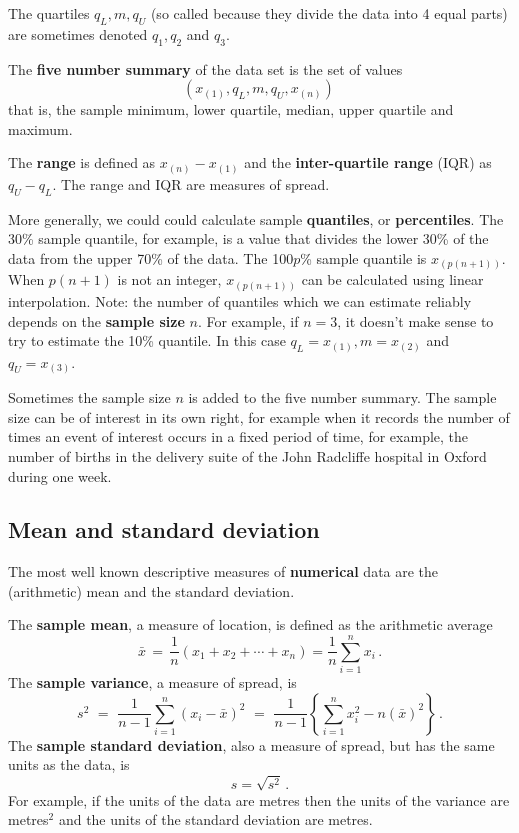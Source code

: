 \documentclass[
  british,
  11pt,
  openany, a4paper]{book}
\begin{document}
The quartiles \(q_L, m, q_U\) (so called because they divide the data into 4 equal parts) are sometimes denoted \(q_1, q_2\) and \(q_3\).

The \textbf{five number summary} of the data set is the set of values
\[(x_{(1)},q_L,m,q_U,x_{(n)})\,\]
that is, the sample minimum, lower quartile, median, upper quartile and maximum.

The \textbf{range} is defined as \(x_{(n)}-x_{(1)}\) and the \textbf{inter-quartile
range} (IQR) as \(q_U-q_L\). The range and IQR are measures of spread.

More generally, we could could calculate sample \textbf{quantiles}, or \textbf{percentiles}. The 30\% sample quantile, for example, is a value that divides the lower 30\% of the data from the upper 70\% of the data. The 100\(p\)\% sample quantile is \(x_{(p(n+1))}\). When \(p(n+1)\) is not an integer, \(x_{(p(n+1))}\) can be calculated using linear interpolation. Note: the number of quantiles which we can estimate reliably depends on the \textbf{sample size} \(n\). For example, if \(n=3\), it doesn't make sense to try to estimate the 10\% quantile. In this case \(q_L=x_{(1)}, m=x_{(2)}\) and \(q_U=x_{(3)}\).

Sometimes the sample size \(n\) is added to the five number summary. The
sample size can be of interest in its own right, for example when it records the
number of times an event of interest occurs in a fixed period of time,
for example, the number of births in the delivery suite of the John Radcliffe
hospital in Oxford during one week.

\subsection{Mean and standard deviation}\label{meanstdev}

The most well known descriptive measures of \textbf{numerical} data are the (arithmetic) mean and the standard deviation.

The \textbf{sample mean}, a measure of location, is defined as the arithmetic average
\[ \bar{x}\,=\,\frac{1}{n}(x_1+x_2+\cdots+x_n)=\frac{1}{n}\sum_{i=1}^n x_i\,.\]
The \textbf{sample variance}, a measure of spread, is
\[ s^2 \,\,=\,\, \frac{1}{n-1}\sum_{i=1}^n (x_i-\bar{x})^2 \,\,=\,\, \frac{1}{n-1}\left\{\sum_{i=1}^n x_i^2 - n(\bar{x})^2\right\}\,.\]
The \textbf{sample standard deviation}, also a measure of spread, but has the same units as the data, is
\[ s=\sqrt{s^2} \,.\]
For example, if the units of the data are metres then the units of the variance are metres\(^2\) and the units of the standard deviation are metres.
\end{document}
